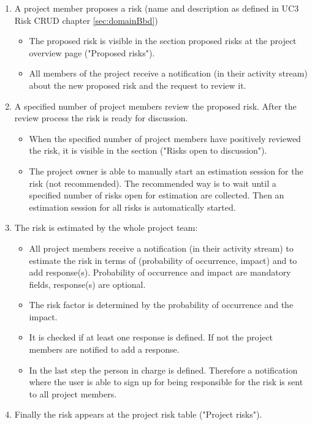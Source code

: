 \begin{enumerate}
	\vspace{-3mm}
	\setlength\itemsep{-1em}
	
	\item A project member proposes a risk (name and description as defined in UC3 Risk CRUD chapter \ref{sec:domainBbd})
	\begin{itemize}
		\vspace{-3mm}
		\setlength\itemsep{-1em}
		
		\item The proposed risk is visible in the section proposed risks at the project overview page ("Proposed risks").
		\item All members of the project receive a notification (in their activity stream) about the new proposed risk and the request to review it.
	\end{itemize}
	
	\item A specified number of project members review the proposed risk. After the review process the risk is ready for discussion.
	\begin{itemize}
		\vspace{-3mm}
		\setlength\itemsep{-1em}
		
		\item When the specified number of project members have positively reviewed the risk, it is visible in the section ("Risks open to discussion").
		\item The project owner is able to manually start an estimation session for the risk (not recommended). The recommended way is to wait until a specified number of risks open for estimation are collected. Then an estimation session for all risks is automatically started.
	\end{itemize}
		
	\item The risk is estimated by the whole project team:
	\begin{itemize}
		\vspace{-3mm}
		\setlength\itemsep{-1em}
		
		\item All project members receive a notification (in their activity stream) to estimate the risk in terms of (probability of occurrence, impact) and to add response(s). Probability of occurrence and impact are mandatory fields, response(s) are optional.
		\item The risk factor is determined by the probability of occurrence and the impact.
		\item It is checked if at least one response is defined. If not the project members are notified to add a response.
		\item In the last step the person in charge is defined. Therefore a notification where the user is able to sign up for being responsible for the risk is sent to all project members.  
	\end{itemize}

	\item Finally the risk appears at the project risk table ("Project risks").
	
\end{enumerate}

